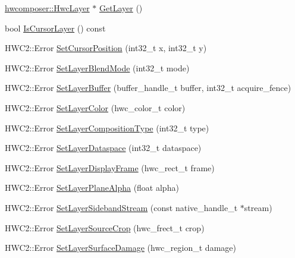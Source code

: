 \begin{DoxyCompactItemize}
\item 
\mbox{\hyperlink{structhwcomposer_1_1HwcLayer}{hwcomposer\+::\+Hwc\+Layer}} $\ast$ \mbox{\hyperlink{classandroid_1_1IAHWC2_1_1Hwc2Layer_a743e0967bebe3cfefe1bff652cfae999}{Get\+Layer}} ()
\item 
bool \mbox{\hyperlink{classandroid_1_1IAHWC2_1_1Hwc2Layer_ae200b22303db92403a3526e3ce03fba7}{Is\+Cursor\+Layer}} () const
\item 
H\+W\+C2\+::\+Error \mbox{\hyperlink{classandroid_1_1IAHWC2_1_1Hwc2Layer_ae0e07b5f0856ec0358cb1c3e5101a9d8}{Set\+Cursor\+Position}} (int32\+\_\+t x, int32\+\_\+t y)
\item 
H\+W\+C2\+::\+Error \mbox{\hyperlink{classandroid_1_1IAHWC2_1_1Hwc2Layer_aeebdea172047373bebe04aacd0c12984}{Set\+Layer\+Blend\+Mode}} (int32\+\_\+t mode)
\item 
H\+W\+C2\+::\+Error \mbox{\hyperlink{classandroid_1_1IAHWC2_1_1Hwc2Layer_a748f182bf70067e273088e19bc55c4de}{Set\+Layer\+Buffer}} (buffer\+\_\+handle\+\_\+t buffer, int32\+\_\+t acquire\+\_\+fence)
\item 
H\+W\+C2\+::\+Error \mbox{\hyperlink{classandroid_1_1IAHWC2_1_1Hwc2Layer_a13c6379bb7319dcb0fc8ae6b6df3ae85}{Set\+Layer\+Color}} (hwc\+\_\+color\+\_\+t color)
\item 
H\+W\+C2\+::\+Error \mbox{\hyperlink{classandroid_1_1IAHWC2_1_1Hwc2Layer_a04088743426ddc86a6cbf0e989a7c583}{Set\+Layer\+Composition\+Type}} (int32\+\_\+t type)
\item 
H\+W\+C2\+::\+Error \mbox{\hyperlink{classandroid_1_1IAHWC2_1_1Hwc2Layer_a8623df440e40f374a16bcc0880f0a8d0}{Set\+Layer\+Dataspace}} (int32\+\_\+t dataspace)
\item 
H\+W\+C2\+::\+Error \mbox{\hyperlink{classandroid_1_1IAHWC2_1_1Hwc2Layer_a224e34e2bfd8844cc884b940a43440d4}{Set\+Layer\+Display\+Frame}} (hwc\+\_\+rect\+\_\+t frame)
\item 
H\+W\+C2\+::\+Error \mbox{\hyperlink{classandroid_1_1IAHWC2_1_1Hwc2Layer_a5e24e6a5a3cea60c8988b707893e0b6f}{Set\+Layer\+Plane\+Alpha}} (float alpha)
\item 
H\+W\+C2\+::\+Error \mbox{\hyperlink{classandroid_1_1IAHWC2_1_1Hwc2Layer_af54a365509e49e3229e21ce63dc1475d}{Set\+Layer\+Sideband\+Stream}} (const native\+\_\+handle\+\_\+t $\ast$stream)
\item 
H\+W\+C2\+::\+Error \mbox{\hyperlink{classandroid_1_1IAHWC2_1_1Hwc2Layer_ac093db321158cb01dfcdd646ddd037fe}{Set\+Layer\+Source\+Crop}} (hwc\+\_\+frect\+\_\+t crop)
\item 
H\+W\+C2\+::\+Error \mbox{\hyperlink{classandroid_1_1IAHWC2_1_1Hwc2Layer_a7d67bc2cbcef22cf7d4bdd603d56ddd6}{Set\+Layer\+Surface\+Damage}} (hwc\+\_\+region\+\_\+t damage)

\end{DoxyCompactItemize}
